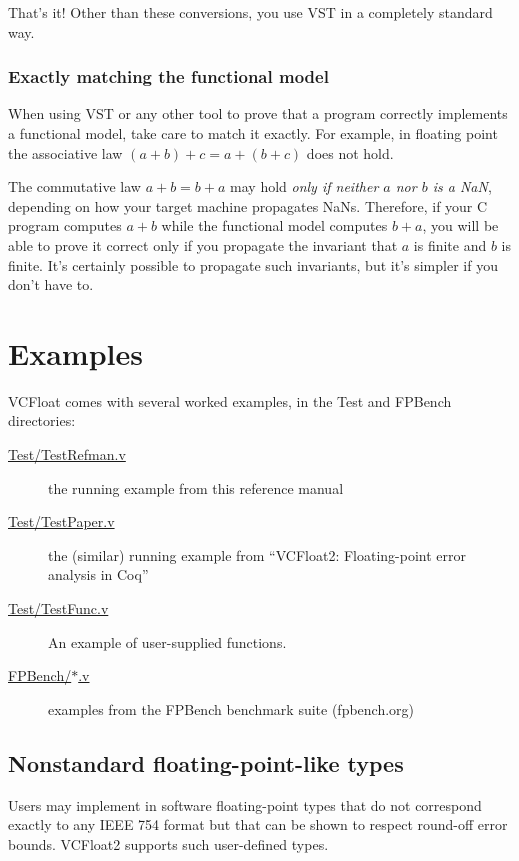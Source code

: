 \documentclass[article]{memoir}
\begin{document}
That's it!  Other than these conversions, you use VST in
a completely standard way.  

\subsection*{Exactly matching the functional model}

When using VST or any other tool to prove that a program correctly
implements a functional model, take care to
match it exactly.  For example, in floating point the
associative law $(a+b)+c=a+(b+c)$ does not hold.

The commutative law $a+b=b+a$ may hold \emph{only if
neither $a$ nor $b$ is a NaN}, depending on how your target
machine propagates NaNs.  Therefore, if your C program
computes $a+b$ while the functional model computes $b+a$,
you will be able to prove it correct only if you propagate
the invariant that $a$ is finite and $b$ is finite.
It's certainly possible to propagate such invariants, but
it's simpler if you don't have to.

\chapter{Examples}

VCFloat comes with several worked examples, in the Test and FPBench directories:
\begin{description}
\item[\href{../Test/TestRefman.v}{Test/TestRefman.v}]  the running example from this reference manual
\item[\href{../Test/TestPaper.v}{Test/TestPaper.v}]  the (similar) running example from ``VCFloat2: Floating-point error analysis in Coq''
\item[\href{../Test/TestFunc.v}{Test/TestFunc.v}]  An example of user-supplied functions.
\item[\href{../FPBench/}{FPBench/$*$.v}]  examples from the FPBench benchmark suite (fpbench.org)
\end{description}

\section{Nonstandard floating-point-like types}
\label{nonstandard}

Users may implement in software floating-point types that do not
correspond exactly to any IEEE 754 format but that can be shown 
to respect round-off error bounds. 
VCFloat2 supports such user-defined types.
\end{document}
